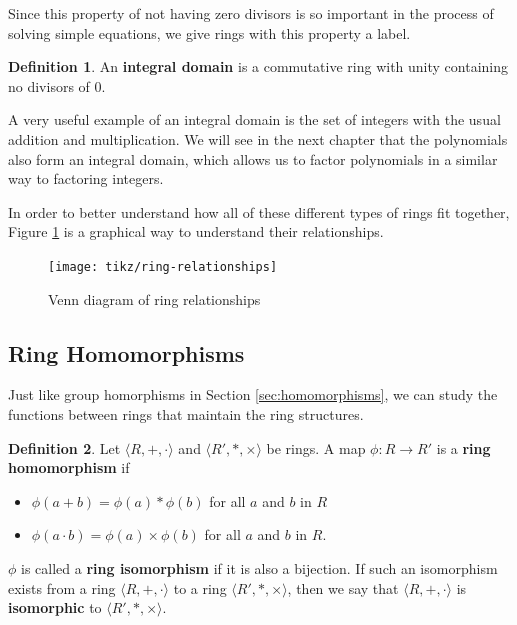 \documentclass[
]{book}
\providecommand{\tightlist}{%
  \setlength{\itemsep}{0pt}\setlength{\parskip}{0pt}}
\theoremstyle{definition}
\newtheorem{definition}{Definition}[chapter]
\theoremstyle{definition}
\theoremstyle{definition}
\theoremstyle{remark}
\begin{document}
Since this property of not having zero divisors is so important in the process of solving simple equations, we give rings with this property a label.

\begin{definition}
\protect\hypertarget{def:unnamed-chunk-176}{}{\label{def:unnamed-chunk-176} }An \textbf{integral domain} is a commutative ring with unity containing no divisors of \(0\).
\end{definition}

A very useful example of an integral domain is the set of integers with the usual addition and multiplication. We will see in the next chapter that the polynomials also form an integral domain, which allows us to factor polynomials in a similar way to factoring integers.

In order to better understand how all of these different types of rings fit together, Figure \ref{fig:venn-rings} is a graphical way to understand their relationships.

\begin{figure}

{\centering \texttt{[image: tikz/ring-relationships]} 

}

\caption{Venn diagram of ring relationships}\label{fig:venn-rings}
\end{figure}

\hypertarget{ring-homomorphisms}{%
\subsection{Ring Homomorphisms}\label{ring-homomorphisms}}

Just like group homorphisms in Section \ref{sec:homomorphisms}, we can study the functions between rings that maintain the ring structures.

\begin{definition}
\protect\hypertarget{def:unnamed-chunk-177}{}{\label{def:unnamed-chunk-177} }Let \(\langle R,+,\cdot\rangle\) and \(\langle R',\ast,\times\rangle\) be rings. A map \(\phi:R\rightarrow R'\) is a \textbf{ring homomorphism} if

\begin{itemize}
\tightlist
\item
  \(\phi(a+b)=\phi(a) \ast \phi(b)\) for all \(a\) and \(b\) in \(R\)
\item
  \(\phi(a\cdot b)=\phi(a)\times \phi(b)\) for all \(a\) and \(b\) in \(R\).
\end{itemize}

\(\phi\) is called a \textbf{ring isomorphism} if it is also a bijection. If such an isomorphism exists from a ring \(\langle R,+,\cdot\rangle\) to a ring \(\langle R',\ast,\times\rangle\), then we say that \(\langle R,+,\cdot\rangle\) is \textbf{isomorphic} to \(\langle R',\ast,\times\rangle\).
\end{definition}
\end{document}

